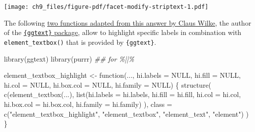 \documentclass[
  letterpaper,
]{scrbook}
\newenvironment{Shaded}{\begin{snugshade}}{\end{snugshade}}
\newcommand{\AttributeTok}[1]{\textcolor[rgb]{0.40,0.45,0.13}{#1}}
\newcommand{\ConstantTok}[1]{\textcolor[rgb]{0.56,0.35,0.01}{#1}}
\newcommand{\ControlFlowTok}[1]{\textcolor[rgb]{0.00,0.23,0.31}{#1}}
\newcommand{\DocumentationTok}[1]{\textcolor[rgb]{0.37,0.37,0.37}{\textit{#1}}}
\newcommand{\FunctionTok}[1]{\textcolor[rgb]{0.28,0.35,0.67}{#1}}
\newcommand{\NormalTok}[1]{\textcolor[rgb]{0.00,0.23,0.31}{#1}}
\newcommand{\OtherTok}[1]{\textcolor[rgb]{0.00,0.23,0.31}{#1}}
\newcommand{\StringTok}[1]{\textcolor[rgb]{0.13,0.47,0.30}{#1}}
\begin{document}
\texttt{[image: ch9\_files/figure-pdf/facet-modify-striptext-1.pdf]}

The following
\href{https://stackoverflow.com/questions/60332202/conditionally-fill-ggtext-text-boxes-in-facet-wrap}{two
functions adapted from this answer by Claus Wilke}, the author of the
\href{https://wilkelab.org/ggtext/}{\texttt{\{ggtext\}} package}, allow
to highlight specific labels in combination with
\texttt{element\_textbox()} that is provided by \texttt{\{ggtext\}}.

\begin{Shaded}
\begin{Highlighting}[]
\FunctionTok{library}\NormalTok{(ggtext)}
\FunctionTok{library}\NormalTok{(purrr) }\DocumentationTok{\#\# for \%||\%}

\NormalTok{element\_textbox\_highlight }\OtherTok{\textless{}{-}} \ControlFlowTok{function}\NormalTok{(..., }\AttributeTok{hi.labels =} \ConstantTok{NULL}\NormalTok{, }\AttributeTok{hi.fill =} \ConstantTok{NULL}\NormalTok{,}
                                      \AttributeTok{hi.col =} \ConstantTok{NULL}\NormalTok{, }\AttributeTok{hi.box.col =} \ConstantTok{NULL}\NormalTok{, }\AttributeTok{hi.family =} \ConstantTok{NULL}\NormalTok{) \{}
  \FunctionTok{structure}\NormalTok{(}
    \FunctionTok{c}\NormalTok{(}\FunctionTok{element\_textbox}\NormalTok{(...),}
      \FunctionTok{list}\NormalTok{(}\AttributeTok{hi.labels =}\NormalTok{ hi.labels, }\AttributeTok{hi.fill =}\NormalTok{ hi.fill, }\AttributeTok{hi.col =}\NormalTok{ hi.col, }\AttributeTok{hi.box.col =}\NormalTok{ hi.box.col, }\AttributeTok{hi.family =}\NormalTok{ hi.family)}
\NormalTok{    ),}
    \AttributeTok{class =} \FunctionTok{c}\NormalTok{(}\StringTok{"element\_textbox\_highlight"}\NormalTok{, }\StringTok{"element\_textbox"}\NormalTok{, }\StringTok{"element\_text"}\NormalTok{, }\StringTok{"element"}\NormalTok{)}
\NormalTok{  )}
\NormalTok{\}}


\end{Highlighting}
\end{Shaded}
\end{document}
